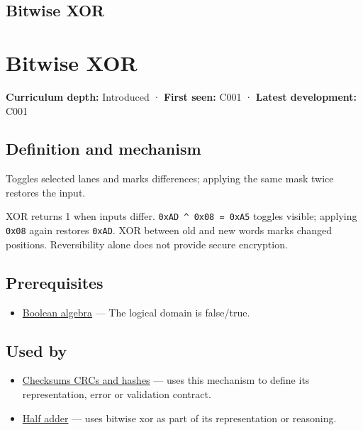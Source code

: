\hypertarget{appendix-d49161831368}{}
\section*{Bitwise XOR}
\chapter{Bitwise XOR}\label{appendix-d49161831368-bitwise-xor}

\textbf{Curriculum depth:} Introduced · \textbf{First seen:} C001 · \textbf{Latest development:} C001

\section{Definition and mechanism}\label{appendix-d49161831368-definition-and-mechanism}

Toggles selected lanes and marks differences; applying the same mask twice restores the input.

XOR returns 1 when inputs differ. \texttt{0xAD\ \^{}\ 0x08\ =\ 0xA5} toggles visible; applying \texttt{0x08} again restores \texttt{0xAD}. XOR between old and new words marks changed positions. Reversibility alone does not provide secure encryption.

\section{Prerequisites}\label{appendix-d49161831368-prerequisites}

\begin{itemize}
\tightlist
\item
  \hyperref[appendix-24475e1596a8]{Boolean algebra} --- The logical domain is false/true.
\end{itemize}

\section{Used by}\label{appendix-d49161831368-used-by}

\begin{itemize}
\item
  \hyperref[appendix-ed338677de0a]{Checksums CRCs and hashes} --- uses this mechanism to define its representation, error or validation contract.
\item
  \hyperref[appendix-1652d27a8e90]{Half adder} --- uses bitwise xor as part of its representation or reasoning.
\end{itemize}


